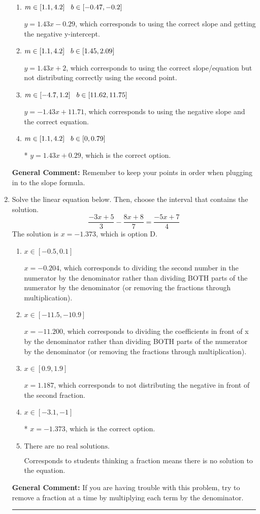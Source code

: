 \documentclass{extbook}[14pt]
\newcommand{\litem}[1]{\item #1

\rule{\textwidth}{0.4pt}}
\begin{document}
\begin{enumerate}
{\begin{enumerate}[label=\Alph*.]
 $y = 1.43x -1$, which corresponds to using the correct slope/equation but not distributing correctly using the first point.
\item \( m \in [1.1, 4.2] \hspace*{3mm} b \in [-0.47, -0.2] \)

 $y = 1.43x -0.29$, which corresponds to using the correct slope and getting the negative y-intercept.
\item \( m \in [1.1, 4.2] \hspace*{3mm} b \in [1.45, 2.09] \)

 $y = 1.43x + 2$, which corresponds to using the correct slope/equation but not distributing correctly using the second point.
\item \( m \in [-4.7, 1.2] \hspace*{3mm} b \in [11.62, 11.75] \)

 $y = -1.43x + 11.71$, which corresponds to using the negative slope and the correct equation.
\item \( m \in [1.1, 4.2] \hspace*{3mm} b \in [0, 0.79] \)

* $y = 1.43x + 0.29$, which is the correct option.
\end{enumerate}

\textbf{General Comment:} Remember to keep your points in order when plugging in to the slope formula.
}
\litem{
Solve the linear equation below. Then, choose the interval that contains the solution.
\[ \frac{-3x + 5}{3} - \frac{8x + 8}{7} = \frac{-5x + 7}{4} \]The solution is \( x = -1.373 \), which is option D.\begin{enumerate}[label=\Alph*.]
\item \( x \in [-0.5, 0.1] \)

 $x = -0.204$, which corresponds to dividing the second number in the numerator by the denominator rather than dividing BOTH parts of the numerator by the denominator (or removing the fractions through multiplication).
\item \( x \in [-11.5, -10.9] \)

 $x = -11.200$, which corresponds to dividing the coefficients in front of x by the denominator rather than dividing BOTH parts of the numerator by the denominator (or removing the fractions through multiplication).
\item \( x \in [0.9, 1.9] \)

 $x = 1.187$, which corresponds to not distributing the negative in front of the second fraction.
\item \( x \in [-3.1, -1] \)

* $x = -1.373$, which is the correct option.
\item \( \text{There are no real solutions.} \)

Corresponds to students thinking a fraction means there is no solution to the equation.
\end{enumerate}

\textbf{General Comment:} If you are having trouble with this problem, try to remove a fraction at a time by multiplying each term by the denominator.
}
\end{enumerate}
\end{document}
